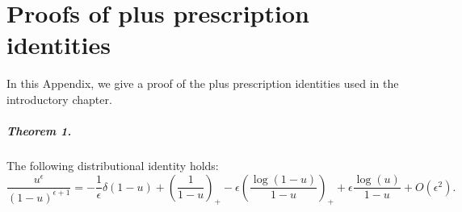 \documentclass[withindex,glossary]{cam-thesis}
\begin{document}
%

\renewcommand{\bibname}{References}
\cleardoublepage
{}
{}






\appendix

\chapter{Proofs of plus prescription identities}
\label{app:plus_prescription}
In this Appendix, we give a proof of the plus prescription identities used in the introductory chapter.

\paragraph{Theorem 1.} The following distributional identity holds:
\begin{equation}
\label{eq:plus_identity_2}
\frac{u^{\epsilon}}{(1-u)^{\epsilon+1}} = -\frac{1}{\epsilon} \delta(1-u) + \left( \frac{1}{1-u} \right)_+ - \epsilon \left( \frac{\log(1-u)}{1-u} \right)_+ + \epsilon \frac{\log(u)}{1-u} + O(\epsilon^2).
\end{equation}
\end{document}
